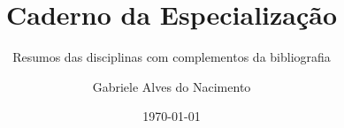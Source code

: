 \documentclass[
	a4paper, %
	fontsize=10pt, %
	twoside=true, %
	numbers=noenddot, %
]{kaobook}
\begin{document}

\title{Caderno da Especialização}
\subtitle{Resumos das disciplinas com complementos da bibliografia}

\author{Gabriele Alves do Nacimento}

\date{\today}





\frontmatter %








\begingroup %
\end{document}
